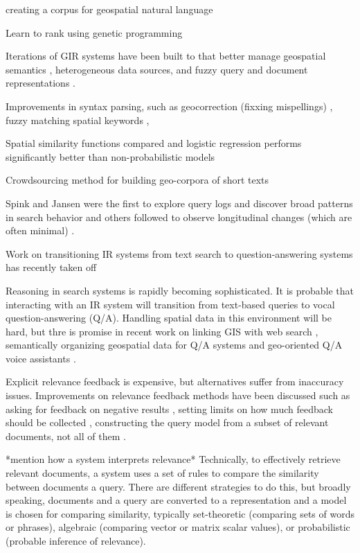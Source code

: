 creating a corpus for geospatial natural language \cite{Stock2013}


Learn to rank using genetic programming \cite{Yeh2017}

Iterations of GIR systems have been built to that better manage geospatial semantics \cite{Jones2004} \cite{Jones2002}, heterogeneous data sources\cite{Hu2007}, and fuzzy query and document representations \cite{Bordogna2012}.

Improvements in syntax parsing, such as geocorrection (fixxing mispellings) \cite{Alsubaiee2009}, fuzzy matching spatial keywords \cite{Zhang2017}, 

Spatial similarity functions compared and logistic regression performs significantly better than non-probabilistic models \cite{Frontiera2008}

Crowdsourcing method for building geo-corpora of short texts \cite{Wallgrun2017}

Spink and Jansen \cite{Spink2001} \cite{Spink2002} were the first to explore query logs and discover broad patterns in search behavior and others followed to observe longitudinal changes (which are often minimal) \cite{Wang2003}.

\cite{Cole2011}


Work on transitioning IR systems from text search to question-answering systems has recently taken off 

Reasoning in search systems is rapidly becoming sophisticated. It is probable that interacting with an IR system will transition from text-based queries to vocal question-answering (Q/A). Handling spatial data in this environment will be hard, but thre is promise in recent work on linking GIS with web search \cite{Tezuka2006}, semantically organizing geospatial data for Q/A systems \cite{Mai2018} and geo-oriented Q/A voice assistants \cite{Lafia2019}.

Explicit relevance feedback is expensive, but alternatives suffer from inaccuracy issues. Improvements on relevance feedback methods have been discussed such as asking for feedback on negative results \cite{Ma2014}, setting limits on how much feedback should be collected \cite{Losada2019}, constructing the query model from a subset of relevant documents, not all of them \cite{Raiber2019}.


*mention how a system interprets relevance* 
 Technically, to effectively retrieve relevant documents, a system uses a set of rules to compare the similarity between documents a query. There are different strategies to do this, but broadly speaking, documents and a query are converted to a representation and a model is chosen for comparing similarity, typically set-theoretic (comparing sets of words or phrases), algebraic (comparing vector or matrix scalar values), or probabilistic (probable inference of relevance).

